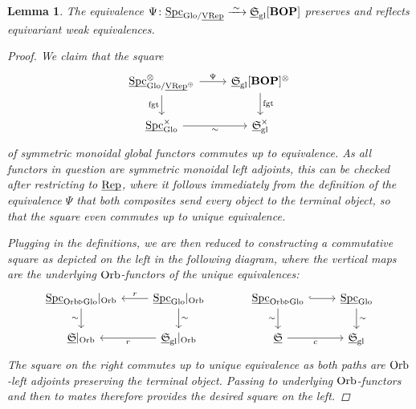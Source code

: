 \documentclass[reqno]{memo-l}
\theoremstyle{mythm}
\newtheorem{lemma}[thm]{Lemma}
\theoremstyle{definition}
\numberwithin{equation}{section}
\newcommand{\gl}{\textup{gl}}
\DeclareMathOperator{\Spc}{Spc}
\newcommand{\cat}[1]{\textbf{\textup{#1}}}
\newcommand{\fgt}{\textup{fgt}}
\newcommand{\Orb}{{\vphantom{\textup{t}}\smash{\textup{Orb}}}}
\newcommand{\Glo}{\textup{Glo}}
\newcommand{\ulhelper}[2]{\underline{\setbox0=\hbox{$#1#2$}\dp0=0.4pt \box0\relax}}
\newcommand{\ul}[1]{{\mathpalette\ulhelper{#1}}\hbox{\rule[-2pt]{0pt}{0pt}}}
\newcommand{\iso}{\xrightarrow{\;\smash{\raisebox{-0.25ex}{\ensuremath{\scriptstyle\sim}}}\;}}
\newcommand{\myS}{{{\mathfrak S\kern-.4pt}}}
\newcommand{\Rep}{\textup{Rep}}
\newcommand{\VRep}{\textup{VRep}}
\begin{document}
\begin{lemma}
    The equivalence $\Psi\colon\ul\Spc_{\Glo/\ul\VRep}\iso\ul\myS_\gl[\cat{BOP}]$ preserves and reflects equivariant weak equivalences.
    \begin{proof}
        We claim that the square
        \[
            \begin{tikzcd}
                \ul\Spc_{\Glo/\ul\VRep^\oplus}^\otimes\arrow[d,"\fgt"']\arrow[r,"\Psi"] & \ul\myS_\gl[\cat{BOP}]^\otimes\arrow[d,"\fgt"]\\
                \ul\Spc_{\Glo}^\times\arrow[r,"\sim"'] & \ul\myS_\gl^\times
            \end{tikzcd}
        \]
        of symmetric monoidal global functors commutes up to equivalence. As all functors in question are symmetric monoidal left adjoints, this can be checked after restricting to $\ul\Rep$, where it follows immediately from the definition of the equivalence $\Psi$ that both composites send every object to the terminal object, so that the square even commutes up to unique equivalence.

        Plugging in the definitions, we are then reduced to constructing a commutative square as depicted on the left in the following diagram, where the vertical maps are the underlying $\Orb$-functors of the unique equivalences:
        \[
            \begin{tikzcd}
                \ul\Spc_{\Orb\triangleright\Glo}|_\Orb\arrow[from=r,"r"']\arrow[d,"\sim"'] & \ul\Spc_{\Glo}|_\Orb\arrow[d,"\sim"] &[1em] \ul\Spc_{\Orb\triangleright\Glo}\arrow[r,hook]\arrow[d,"\sim"'] & \ul\Spc_{\Glo}\arrow[d,"\sim"]\\
                \ul\myS|_\Orb\arrow[from=r,"r"] &\ul\myS_\gl|_\Orb & \ul\myS\arrow[r,"c"'] & \ul\myS_\gl
            \end{tikzcd}
        \]
        The square on the right commutes up to unique equivalence as both paths are $\Orb$-left adjoints preserving the terminal object. Passing to underlying $\Orb$-functors and then to mates therefore provides the desired square on the left.
    \end{proof} 
\end{lemma}
\end{document}
